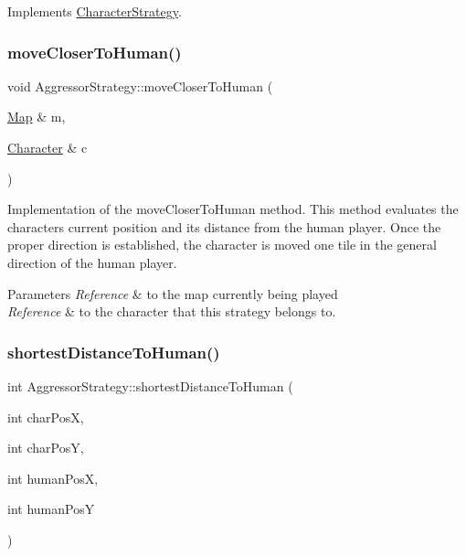 Implements \hyperlink{class_character_strategy}{Character\+Strategy}.

\hypertarget{class_aggressor_strategy_a375f0346535b7a684f5222780d1cfde9}{}\label{class_aggressor_strategy_a375f0346535b7a684f5222780d1cfde9} 
\subsubsection{\texorpdfstring{move\+Closer\+To\+Human()}{moveCloserToHuman()}}
{\footnotesize\ttfamily void Aggressor\+Strategy\+::move\+Closer\+To\+Human (\begin{DoxyParamCaption}\item[{\hyperlink{class_map}{Map} \&}]{m,  }\item[{\hyperlink{class_character}{Character} \&}]{c }\end{DoxyParamCaption})}

Implementation of the move\+Closer\+To\+Human method. This method evaluates the character\textquotesingle{}s current position and its distance from the human player. Once the proper direction is established, the character is moved one tile in the general direction of the human player. 
\begin{DoxyParams}{Parameters}
{\em Reference} & to the map currently being played \\
\hline
{\em Reference} & to the character that this strategy belongs to. \\
\hline
\end{DoxyParams}
\hypertarget{class_aggressor_strategy_aff8804c562838466c0bc7dd5a7abcbb5}{}\label{class_aggressor_strategy_aff8804c562838466c0bc7dd5a7abcbb5} 
\subsubsection{\texorpdfstring{shortest\+Distance\+To\+Human()}{shortestDistanceToHuman()}}
{\footnotesize\ttfamily int Aggressor\+Strategy\+::shortest\+Distance\+To\+Human (\begin{DoxyParamCaption}\item[{int}]{char\+PosX,  }\item[{int}]{char\+PosY,  }\item[{int}]{human\+PosX,  }\item[{int}]{human\+PosY }\end{DoxyParamCaption})}

